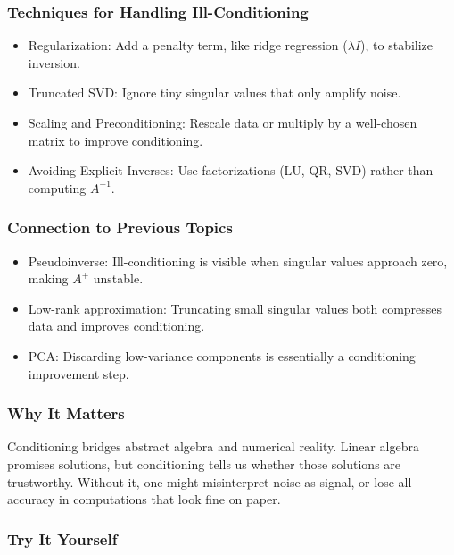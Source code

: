 \documentclass[
  letterpaper,
  DIV=11,
  numbers=noendperiod]{scrreprt}
\providecommand{\tightlist}{%
  \setlength{\itemsep}{0pt}\setlength{\parskip}{0pt}}
\begin{document}
\subsubsection{Techniques for Handling
Ill-Conditioning}\label{techniques-for-handling-ill-conditioning}

\begin{itemize}
\tightlist
\item
  Regularization: Add a penalty term, like ridge regression
  (\(\lambda I\)), to stabilize inversion.
\item
  Truncated SVD: Ignore tiny singular values that only amplify noise.
\item
  Scaling and Preconditioning: Rescale data or multiply by a well-chosen
  matrix to improve conditioning.
\item
  Avoiding Explicit Inverses: Use factorizations (LU, QR, SVD) rather
  than computing \(A^{-1}\).
\end{itemize}

\subsubsection{Connection to Previous
Topics}\label{connection-to-previous-topics}

\begin{itemize}
\tightlist
\item
  Pseudoinverse: Ill-conditioning is visible when singular values
  approach zero, making \(A^+\) unstable.
\item
  Low-rank approximation: Truncating small singular values both
  compresses data and improves conditioning.
\item
  PCA: Discarding low-variance components is essentially a conditioning
  improvement step.
\end{itemize}

\subsubsection{Why It Matters}\label{why-it-matters-83}

Conditioning bridges abstract algebra and numerical reality. Linear
algebra promises solutions, but conditioning tells us whether those
solutions are trustworthy. Without it, one might misinterpret noise as
signal, or lose all accuracy in computations that look fine on paper.

\subsubsection{Try It Yourself}\label{try-it-yourself-86}
\end{document}
